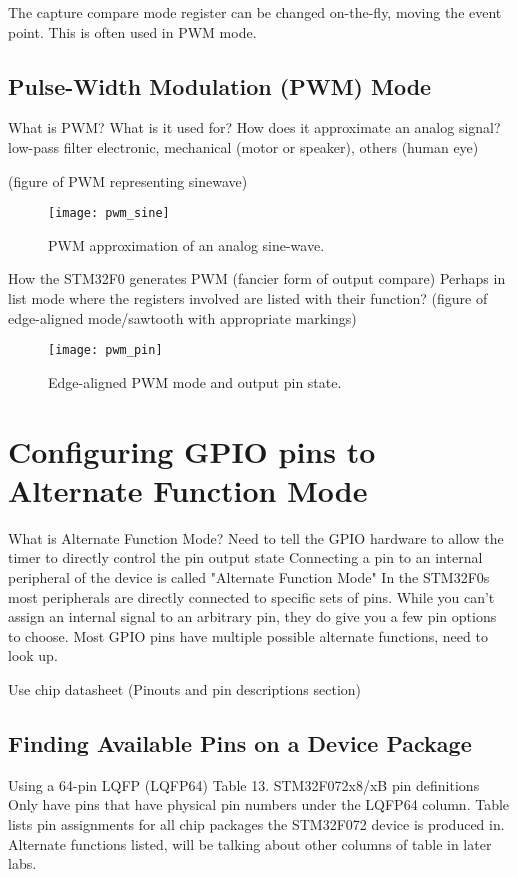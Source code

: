 \documentclass[11pt,fleqn]{book} %
\begin{document}
        The capture compare mode register can be changed on-the-fly, moving the event point. This is often used in PWM mode.
    
    \subsection{Pulse-Width Modulation (PWM) Mode}
    What is PWM?
    What is it used for? How does it approximate an analog signal?
        low-pass filter
        electronic, mechanical (motor or speaker), others (human eye)
        
    (figure of PWM representing sinewave)
    \begin{figure}[]
        \centering\texttt{[image: pwm\_sine]}
        \caption{PWM approximation of an analog sine-wave.}
        \label{pwm_sine}
    \end{figure}
    
    How the STM32F0 generates PWM (fancier form of output compare)
    Perhaps in list mode where the registers involved are listed with their function?
    (figure of edge-aligned mode/sawtooth with appropriate markings)
     \begin{figure}[]
        \centering\texttt{[image: pwm\_pin]}
        \caption{Edge-aligned PWM mode and output pin state.}
        \label{pwm_pin}
    \end{figure}

\section{Configuring GPIO pins to Alternate Function Mode}
    What is Alternate Function Mode?
    Need to tell the GPIO hardware to allow the timer to directly control the pin output state
    Connecting a pin to an internal peripheral of the device is called "Alternate Function Mode"
    In the STM32F0s most peripherals are directly connected to specific sets of pins. 
        While you can't assign an internal signal to an arbitrary pin, they do give you a few pin options to choose.
        Most GPIO pins have multiple possible alternate functions, need to look up. 
    
    Use chip datasheet (Pinouts and pin descriptions section)
    
    \subsection{Finding Available Pins on a Device Package}
    Using a 64-pin LQFP (LQFP64)
    Table 13. STM32F072x8/xB pin definitions
    Only have pins that have physical pin numbers under the LQFP64 column. Table lists pin assignments for all chip packages the STM32F072 device is produced in.
    Alternate functions listed, will be talking about other columns of table in later labs.
    
\end{document}
